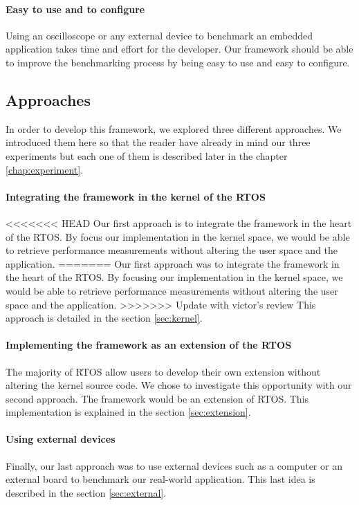 \paragraph{Easy to use and to configure}
Using an oscilloscope or any external device to benchmark an embedded application takes time and effort for the developer.
Our framework should be able to improve the benchmarking process by being easy to use and easy to configure.

\subsection{Approaches}

In order to develop this framework, we explored three different approaches.
We introduced them here so that the reader have already in mind our three experiments but each one of them is described later in the chapter \ref{chap:experiment}.

\paragraph{Integrating the framework in the kernel of the RTOS}
<<<<<<< HEAD
Our first approach is to integrate the framework in the heart of the RTOS.
By focus our implementation in the kernel space, we would be able to retrieve performance measurements without altering the user space and the application.
=======
Our first approach was to integrate the framework in the heart of the RTOS.
By focusing our implementation in the kernel space, we would be able to retrieve performance measurements without altering the user space and the application.
>>>>>>> Update with victor's review
This approach is detailed in the section \ref{sec:kernel}.

\paragraph{Implementing the framework as an extension of the RTOS}
The majority of RTOS allow users to develop their own extension without altering the kernel source code.
We chose to investigate this opportunity with our second approach.
The framework would be an extension of RTOS.
This implementation is explained in the section \ref{sec:extension}.

\paragraph{Using external devices}
Finally, our last approach was to use external devices such as a computer or an external board to benchmark our real-world application.
This last idea is described in the section \ref{sec:external}.
